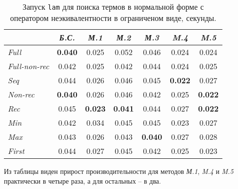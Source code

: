\begin{table}[h!]
\center
\begin{tabular}{|l|c|c|c|c|c|c|}
\hline
   &{\it Б.С.}&{\it М.1}&{\it М.2}&{\it М.3}&{\it M.4}&{\it M.5} \\ \hline

{\it Full        } & {\bf 0.040} &  0.025    & 0.052     &0.046      & 0.024     & 0.024 \\ \hline
{\it Full-non-rec} & 0.042       &  0.025    & 0.042     &0.044      & 0.024     & 0.025 \\ \hline
{\it Seq         } & 0.044       &  0.026    & 0.046     &0.045      &{\bf 0.022}& 0.027 \\ \hline
{\it Non-rec     } & {\bf 0.040} &  0.026    & 0.046     &0.042      & 0.025     &{\bf 0.022} \\ \hline
{\it Rec         } & 0.045       &{\bf 0.023}&{\bf 0.041}&0.044      & 0.027     &{\bf 0.022} \\ \hline
{\it Min         } & 0.042       &  0.034    & 0.045     &0.045      & 0.023     & 0.027 \\ \hline
{\it Max         } & 0.043       &  0.026    & 0.043     &{\bf 0.040}& 0.027     & 0.028 \\ \hline
{\it First       } & 0.044       &  0.027    & 0.045     &0.042      & 0.025     & 0.023 \\ \hline
\end{tabular}
\caption{Запуск \lstinline{lam} для поиска термов в нормальной форме с оператором неэкивалентности в ограниченом виде, секунды.}
\label{fig:lamTestDiseqSimple}
\end{table}

Из таблицы виден прирост производительности для методов {\it М.1}, {\it M.4} и
{\it M.5} практически в четыре раза, а для остальных -- в два. \\

